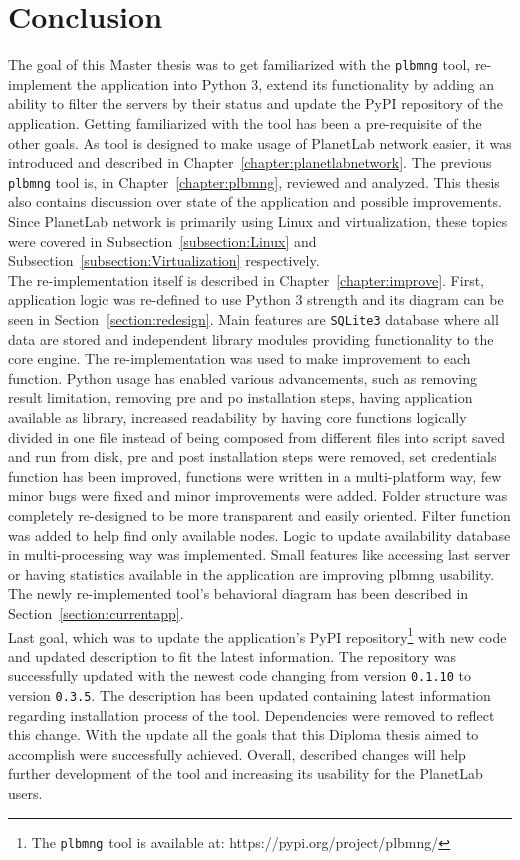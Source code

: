 \chapter{Conclusion}
The goal of this Master thesis was to get familiarized with the \texttt{plbmng} tool, re-implement the application into Python 3, extend its functionality by adding an ability to filter the servers by their status and update the PyPI repository of the application. Getting familiarized with the tool has been a pre-requisite of the other goals. As tool is designed to make usage of PlanetLab network easier, it was introduced and described in Chapter~\ref{chapter:planetlabnetwork}. The previous \texttt{plbmng} tool is, in Chapter~\ref{chapter:plbmng}, reviewed and analyzed. This thesis also contains discussion over state of the application and possible improvements. Since PlanetLab network is primarily using Linux and virtualization, these topics were covered in Subsection~\ref{subsection:Linux} and Subsection~\ref{subsection:Virtualization} respectively.\\
The re-implementation itself is described in Chapter~\ref{chapter:improve}. First, application logic was re-defined to use Python 3 strength and its diagram can be seen in Section~\ref{section:redesign}. Main features are \texttt{SQLite3} database where all data are stored and independent library modules providing functionality to the core engine. The re-implementation was used to make improvement to each function. Python usage has enabled various advancements, such as removing result limitation, removing pre and po installation steps, having application available as library, increased readability by having core functions logically divided in one file instead of being composed from different files into script saved and run from disk, pre and post installation steps were removed, set credentials function has been improved, functions were written in a multi-platform way, few minor bugs were fixed and minor improvements were added. Folder structure was completely re-designed to be more transparent and easily oriented. Filter function was added to help find only available nodes. Logic to update availability database in multi-processing way was implemented. Small features like accessing last server or having statistics available in the application are improving plbmng usability. The newly re-implemented tool's behavioral diagram has been described in Section~\ref{section:currentapp}.\\
Last goal, which was to update the application's PyPI repository\footnote{The \texttt{plbmng} tool is available at: https://pypi.org/project/plbmng/} with new code and updated description to fit the latest information. The repository was successfully updated with the newest code changing from version \texttt{0.1.10} to version \texttt{0.3.5}. The description has been updated containing latest information regarding installation process of the tool. Dependencies were removed to reflect this change. With the update all the goals that this Diploma thesis aimed to accomplish were successfully achieved. Overall, described changes will help further development of the tool and increasing its usability for the PlanetLab users.
